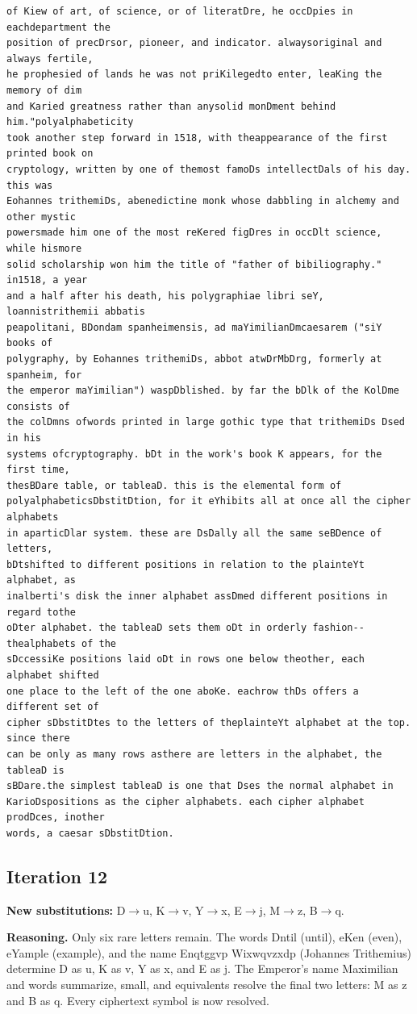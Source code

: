 \documentclass[12pt,a4paper]{article}
\begin{document}
\begin{lstlisting}[caption={Complete text after iteration 11}, label={lst:iter11}]
of Kiew of art, of science, or of literatDre, he occDpies in eachdepartment the
position of precDrsor, pioneer, and indicator. alwaysoriginal and always fertile,
he prophesied of lands he was not priKilegedto enter, leaKing the memory of dim
and Karied greatness rather than anysolid monDment behind him."polyalphabeticity
took another step forward in 1518, with theappearance of the first printed book on
cryptology, written by one of themost famoDs intellectDals of his day. this was
Eohannes trithemiDs, abenedictine monk whose dabbling in alchemy and other mystic
powersmade him one of the most reKered figDres in occDlt science, while hismore
solid scholarship won him the title of "father of bibiliography." in1518, a year
and a half after his death, his polygraphiae libri seY, loannistrithemii abbatis
peapolitani, BDondam spanheimensis, ad maYimilianDmcaesarem ("siY books of
polygraphy, by Eohannes trithemiDs, abbot atwDrMbDrg, formerly at spanheim, for
the emperor maYimilian") waspDblished. by far the bDlk of the KolDme consists of
the colDmns ofwords printed in large gothic type that trithemiDs Dsed in his
systems ofcryptography. bDt in the work's book K appears, for the first time,
thesBDare table, or tableaD. this is the elemental form of
polyalphabeticsDbstitDtion, for it eYhibits all at once all the cipher alphabets
in aparticDlar system. these are DsDally all the same seBDence of letters,
bDtshifted to different positions in relation to the plainteYt alphabet, as
inalberti's disk the inner alphabet assDmed different positions in regard tothe
oDter alphabet. the tableaD sets them oDt in orderly fashion--thealphabets of the
sDccessiKe positions laid oDt in rows one below theother, each alphabet shifted
one place to the left of the one aboKe. eachrow thDs offers a different set of
cipher sDbstitDtes to the letters of theplainteYt alphabet at the top. since there
can be only as many rows asthere are letters in the alphabet, the tableaD is
sBDare.the simplest tableaD is one that Dses the normal alphabet in
KarioDspositions as the cipher alphabets. each cipher alphabet prodDces, inother
words, a caesar sDbstitDtion.
\end{lstlisting}

\clearpage
\subsection{Iteration 12}
\textbf{New substitutions:} D$\to$u, K$\to$v, Y$\to$x, E$\to$j, M$\to$z, B$\to$q.

\textbf{Reasoning.} Only six rare letters remain. The words Dntil (until), eKen (even), eYample (example), and the name Enqtggvp Wixwqvzxdp (Johannes Trithemius) determine D as u, K as v, Y as x, and E as j. The Emperor's name Maximilian and words summarize, small, and equivalents resolve the final two letters: M as z and B as q. Every ciphertext symbol is now resolved.
\end{document}
